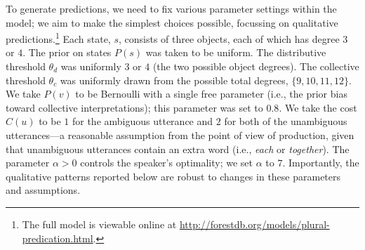 \documentclass[preprint,12pt,authoryear,titlepage]{elsarticle}
\newcommand{\ndg}[1]{\textcolor{Green}{[ndg: #1]}}
\begin{document}

To generate predictions, we need to fix various parameter settings within the model; we aim to make the simplest choices possible, focussing on qualitative predictions.\footnote{The full model is viewable online at \url{http://forestdb.org/models/plural-predication.html}.} %
Each state, $s$, consists of three objects, each of which has degree $3$ or $4$. The prior on states $P(s)$ was taken to be uniform. The distributive threshold $\theta_d$ was uniformly $3$ or $4$ (the two possible object degrees). The collective threshold $\theta_c$ was uniformly drawn from the possible total degrees, $\{9,10,11,12\}$. %
We take $P(v)$ to be Bernoulli with a single free parameter (i.e., the prior bias toward collective interpretations); this parameter was set to $0.8$. 
We take the cost $C(u)$ to be $1$ for the ambiguous utterance and $2$ for both of the unambiguous utterances---a reasonable assumption from the point of view of production, given that unambiguous utterances contain an extra word (i.e., \emph{each} or \emph{together}). The parameter $\alpha > 0$ controls the speaker's optimality; we set $\alpha$ to $7$. 
Importantly, the qualitative patterns reported below are robust to changes in these parameters and assumptions.


\end{document}
